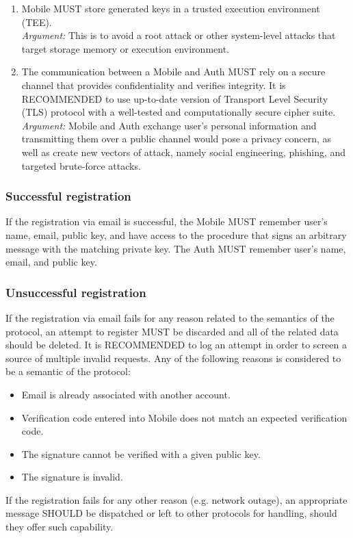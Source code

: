 \begin{enumerate}
                  \item Mobile MUST store generated keys in a trusted execution environment (TEE).\\        
                  \textit{Argument:} This is to avoid a root attack or other system-level attacks that target storage 
                  memory or execution environment.

                  \item The communication between a Mobile and Auth MUST rely on a secure channel that provides 
                        confidentiality and verifies integrity. It is RECOMMENDED to use up-to-date version of 
                        Transport Level Security (TLS) protocol with a well-tested and computationally secure 
                        cipher suite.\\      
                  \textit{Argument:} Mobile and Auth exchange user's personal information and transmitting them over a 
                  public channel would pose a privacy concern, as well as create new vectors of attack, 
                  namely social engineering, phishing, and targeted brute-force attacks.
            \end{enumerate}

            \subsubsection{Successful registration}
            If the registration via email is successful, the Mobile MUST remember user's name, email, public key, and 
            have access to the procedure that signs an arbitrary message with the matching private key. The Auth MUST 
            remember user's name, email, and public key.

            \subsubsection{Unsuccessful registration}
            If the registration via email fails for any reason related to the semantics of the protocol, an attempt to
            register MUST be discarded and all of the related data should be deleted. It is RECOMMENDED to log an attempt
            in order to screen a source of multiple invalid requests. Any of the following reasons is considered to be
            a semantic of the protocol:
            \begin{itemize}
                  \item Email is already associated with another account.
                  \item Verification code entered into Mobile does not match an expected verification code.
                  \item The signature cannot be verified with a given public key.
                  \item The signature is invalid.
            \end{itemize}
            If the registration fails for any other reason (e.g. network outage), an appropriate message SHOULD be
            dispatched or left to other protocols for handling, should they offer such capability.
